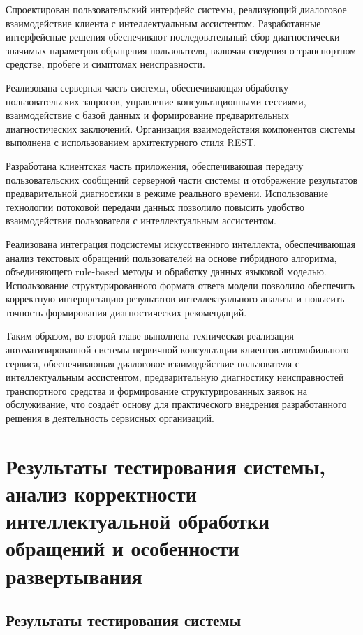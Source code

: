 \documentclass[14pt,a4paper]{extarticle}
\numberwithin{figure}{section}
\numberwithin{table}{section}
\begin{document}
Спроектирован пользовательский интерфейс системы, реализующий диалоговое
взаимодействие клиента с интеллектуальным ассистентом. Разработанные
интерфейсные решения обеспечивают последовательный сбор диагностически
значимых параметров обращения пользователя, включая сведения о
транспортном средстве, пробеге и симптомах неисправности.

Реализована серверная часть системы, обеспечивающая обработку
пользовательских запросов, управление консультационными сессиями,
взаимодействие с базой данных и формирование предварительных
диагностических заключений. Организация взаимодействия компонентов
системы выполнена с использованием архитектурного стиля REST.

Разработана клиентская часть приложения, обеспечивающая передачу
пользовательских сообщений серверной части системы и отображение
результатов предварительной диагностики в режиме реального времени.
Использование технологии потоковой передачи данных позволило повысить
удобство взаимодействия пользователя с интеллектуальным ассистентом.

Реализована интеграция подсистемы искусственного интеллекта,
обеспечивающая анализ текстовых обращений пользователей на основе
гибридного алгоритма, объединяющего rule-based методы и обработку данных
языковой моделью. Использование структурированного формата ответа модели
позволило обеспечить корректную интерпретацию результатов
интеллектуального анализа и повысить точность формирования
диагностических рекомендаций.

Таким образом, во второй главе выполнена техническая реализация
автоматизированной системы первичной консультации клиентов
автомобильного сервиса, обеспечивающая диалоговое взаимодействие
пользователя с интеллектуальным ассистентом, предварительную диагностику
неисправностей транспортного средства и формирование структурированных
заявок на обслуживание, что создаёт основу для практического внедрения
разработанного решения в деятельность сервисных организаций.

\section{Результаты тестирования системы, анализ корректности
интеллектуальной обработки обращений и особенности
развертывания}\label{cha:chapter3}

\subsection{Результаты тестирования
системы}\label{sec:chapter3-tests}
\end{document}
